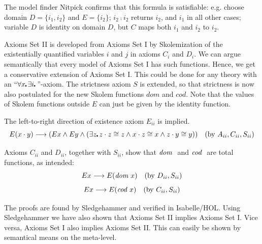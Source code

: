 The model finder Nitpick confirms that this formula is satisfiable:
e.g. choose domain $D=\{i_1,i_2\}$ and $E=\{i_2\}$; $i_2\comp i_2$ returns $i_2$,  and $i_1$
in all other cases; variable $D$ is identity on domain $D$, but $C$ maps both
$i_1$ and $i_2$ to $i_2$. 


Axioms Set II is developed from Axioms Set I by Skolemization of the
existentially quantified variables $i$ and $j$ in axioms $C_i$ and
$D_i$. We can argue semantically that every model of Axioms Set I has
such functions. Hence, we get a conservative extension of Axioms Set
I. This could be done for any theory with an ``$\forall x\lambdot \exists i\lambdot$''-axiom. The strictness axiom $S$ is extended, so
that strictness is now also postulated for the new Skolem functions
$dom$ and $cod$. Note that the values of Skolem functions
outside $E$ can just be given by the identity function.

The left-to-right direction of existence axiom $E_{ii}$ is implied. 
  $$E(x \comp y) \imp (E x \wedge E y \wedge (\exists z\lambdot z \comp z
  \cong z \wedge x \comp z \cong x \wedge z\comp y \cong y)) \quad
  (\text{by } A_{ii}, C_{ii}, S_{ii})$$

Axioms $C_{ii}$ and $D_{ii}$, together with $S_{ii}$, show that
${\textit{dom \/}}$ and ${\textit{cod \/}}$ are total functions, as intended: 
$$E x \longrightarrow E(\textit{dom \/} x) \quad (\text{by } D_{ii}, S_{ii})$$
$$E x \longrightarrow E(\textit{cod \/} x) \quad (\text{by } C_{ii}, S_{ii}) $$

The proofs are found by Sledgehammer and verified in Isabelle/HOL. Using Sledgehammer we have also
shown that Axioms Set II implies Axioms Set I. Vice versa, Axioms Set I
also implies Axioms Set II. This can easily 
be shown by semantical means on the meta-level.

